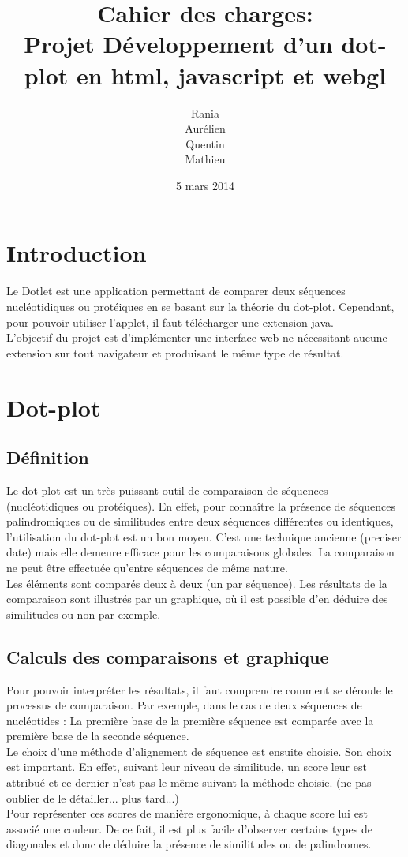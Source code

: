 \documentclass{report}
\title{Cahier des charges: \\Projet Développement d'un dot-plot en html, javascript et webgl }
\author{Rania \bsc{Assab} \\ Aurélien \bsc{Luciani}\\ Quentin \bsc{Riché-Piotaix}\\ Mathieu \bsc{Shaeffer}}
\date{5 mars 2014}
\begin{document}
\maketitle

\tableofcontents
{}

\chapter*{Introduction}

Le Dotlet est une application permettant de comparer deux séquences nucléotidiques ou protéiques en se basant sur la théorie du dot-plot. Cependant, pour pouvoir utiliser l'applet, il faut télécharger une extension java.\\
L'objectif du projet est d'implémenter une interface web ne nécessitant aucune extension sur tout navigateur et produisant le même type de résultat.\\


\chapter{Dot-plot}

\section{Définition}

Le dot-plot est un très puissant outil de comparaison de séquences (nucléotidiques ou protéiques). En effet, pour connaître la présence de séquences palindromiques ou de similitudes entre deux séquences différentes ou identiques, l'utilisation du dot-plot est un bon moyen. C'est une technique ancienne (preciser date) mais elle demeure efficace pour les comparaisons globales.
La comparaison ne peut être effectuée qu'entre séquences de même nature. \\
Les éléments sont comparés deux à deux (un par séquence). Les résultats de la comparaison sont illustrés par un graphique, où il est possible d'en déduire des similitudes ou non par exemple. \\

\section{Calculs des comparaisons et graphique}

Pour pouvoir interpréter les résultats, il faut comprendre comment se déroule le processus de comparaison. Par exemple, dans le cas de deux séquences de nucléotides : La première base de la première séquence est comparée avec la première base de la seconde séquence. \\
Le choix d'une méthode d'alignement de séquence est ensuite choisie. Son choix est important. En effet, suivant leur niveau de similitude, un score leur est attribué et ce dernier n'est pas le même suivant la méthode choisie. (ne pas oublier de le détailler... plus tard...)\\
Pour représenter ces scores de manière ergonomique, à chaque score lui est associé une couleur. De ce fait, il est plus facile d'observer certains types de diagonales et donc de déduire la présence de similitudes ou de palindromes.
\end{document}
